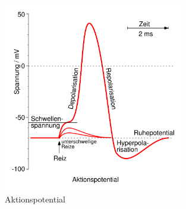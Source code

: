 \begin{figure}
    \centering
    \includegraphics[width=0.7\textwidth]{papers/nerven/Bilder/Aktionspotential.png}
    \caption{Aktionspotential \cite{nerven:JohnEcclesAlanHodgkinAndrewHuxley.}}
    \label{fig:Aktionspotential}
\end{figure}
